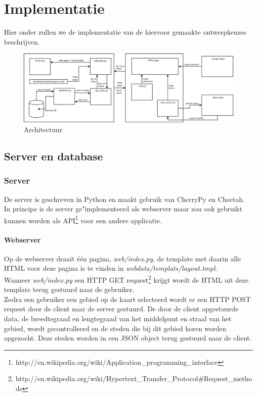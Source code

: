 \documentclass[twoside,openright]{uva-bachelor-thesis}
\begin{document}
\chapter{Implementatie}
	Hier onder zullen we de implementatie van de hiervoor gemaakte ontwerpkeuzes beschrijven.
	\begin{figure}[!htb]
		\label{fig:arch}
		\centering
		\includegraphics[scale=0.3]{./img/architecture.png}
		\caption{Architectuur}
	\end{figure}
	\section{Server en database}
		\subsection{Server}
		De server is geschreven in Python en maakt gebruik van CherryPy en Cheetah. In principe is de server ge"implementeerd als webserver maar zou ook gebruikt kunnen worden als API\footnote{http://en.wikipedia.org/wiki/Application\_programming\_interface} voor een andere applicatie.
		
		\subsubsection{Webserver}
		Op de webserver draait \'e\'en pagina, \textit{web/index.py}, de template met daarin alle HTML voor deze pagina is te vinden in \textit{webdata/templats/layout.tmpl}.
		\\[0.5cm]
		Wanneer \textit{web/index.py} een HTTP GET request\footnote{http://en.wikipedia.org/wiki/Hypertext\_Transfer\_Protocol\#Request\_methods} krijgt wordt de HTML uit deze template terug gestuurd naar de gebruiker.
		\\[0.5cm]
		Zodra een gebruiker een gebied op de kaart selecteerd wordt er een HTTP POST request door de client naar de server gestuurd. De door de client opgestuurde data, de breedtegraad en lengtegraad van het middelpunt en straal van het gebied, wordt gecontrolleerd en de steden die bij dit gebied horen worden opgezocht. Deze steden worden in een JSON object terug gestuurd naar de client.
\end{document}
